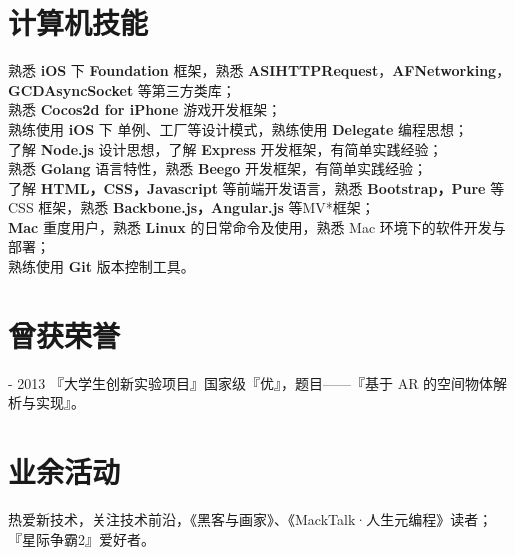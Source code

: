 \documentclass{res}
\begin{document}
\begin{resume}
\section{计算机技能}
\noindent
    熟悉 {\bf iOS} 下 {\bf Foundation} 框架，熟悉 {\bf ASIHTTPRequest}，{\bf AFNetworking}，{\bf GCDAsyncSocket} 等第三方类库；\\
    熟悉 {\bf Cocos2d for iPhone} 游戏开发框架；\\
    熟练使用 {\bf iOS} 下 单例、工厂等设计模式，熟练使用 {\bf Delegate} 编程思想；\\
    了解 {\bf Node.js} 设计思想，了解 {\bf Express} 开发框架，有简单实践经验；\\
    熟悉 {\bf Golang} 语言特性，熟悉 {\bf Beego} 开发框架，有简单实践经验；\\
    了解 {\bf HTML，CSS，Javascript} 等前端开发语言，熟悉 {\bf Bootstrap，Pure} 等 CSS 框架，熟悉 {\bf Backbone.js，Angular.js} 等MV*框架；\\
    {\bf Mac} 重度用户，熟悉 {\bf Linux} 的日常命令及使用，熟悉 Mac 环境下的软件开发与部署；\\
    熟练使用 {\bf Git} 版本控制工具。
 
\section{曾获荣誉}   
 - 2013 『大学生创新实验项目』国家级『优』，题目——『基于 AR 的空间物体解析与实现』。
 
\section{业余活动}
\noindent
    热爱新技术，关注技术前沿，《黑客与画家》、《MackTalk·人生元编程》读者；\\
    『星际争霸2』爱好者。
 
\end{resume}
\end{document}

